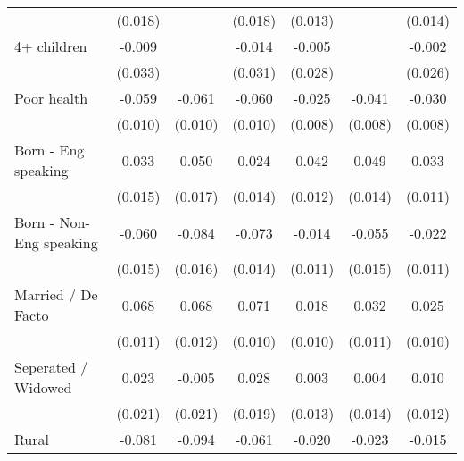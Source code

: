 {\begin{tabular}{l*{6}{c}}
                    &     (0.018)         &                     &     (0.018)         &     (0.013)         &                     &     (0.014)         \\
4+ children         &      -0.009         &                     &      -0.014         &      -0.005         &                     &      -0.002         \\
                    &     (0.033)         &                     &     (0.031)         &     (0.028)         &                     &     (0.026)         \\
Poor health         &      -0.059\sym{***}&      -0.061\sym{***}&      -0.060\sym{***}&      -0.025\sym{***}&      -0.041\sym{***}&      -0.030\sym{***}\\
                    &     (0.010)         &     (0.010)         &     (0.010)         &     (0.008)         &     (0.008)         &     (0.008)         \\
Born - Eng speaking &       0.033\sym{**} &       0.050\sym{***}&       0.024\sym{*}  &       0.042\sym{***}&       0.049\sym{***}&       0.033\sym{***}\\
                    &     (0.015)         &     (0.017)         &     (0.014)         &     (0.012)         &     (0.014)         &     (0.011)         \\
Born - Non-Eng speaking&      -0.060\sym{***}&      -0.084\sym{***}&      -0.073\sym{***}&      -0.014         &      -0.055\sym{***}&      -0.022\sym{**} \\
                    &     (0.015)         &     (0.016)         &     (0.014)         &     (0.011)         &     (0.015)         &     (0.011)         \\
Married / De Facto  &       0.068\sym{***}&       0.068\sym{***}&       0.071\sym{***}&       0.018\sym{*}  &       0.032\sym{***}&       0.025\sym{***}\\
                    &     (0.011)         &     (0.012)         &     (0.010)         &     (0.010)         &     (0.011)         &     (0.010)         \\
Seperated / Widowed &       0.023         &      -0.005         &       0.028         &       0.003         &       0.004         &       0.010         \\
                    &     (0.021)         &     (0.021)         &     (0.019)         &     (0.013)         &     (0.014)         &     (0.012)         \\
Rural               &      -0.081\sym{***}&      -0.094\sym{***}&      -0.061\sym{***}&      -0.020\sym{*}  &      -0.023\sym{**} &      -0.015         \\

\end{tabular}}
